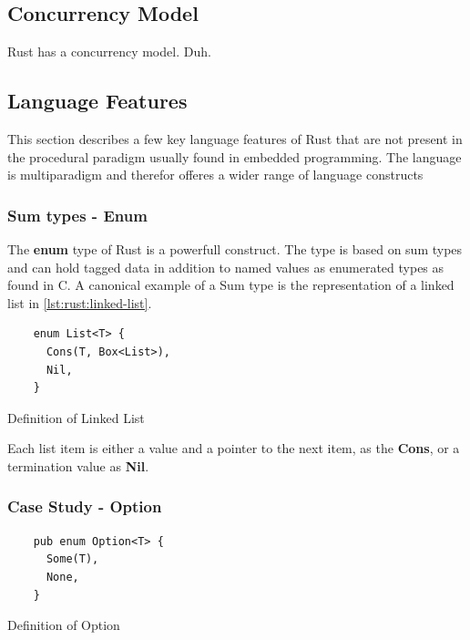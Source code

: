 

\subsection{Concurrency Model} %
\label{ssub:concurrency_model}

Rust has a concurrency model. Duh.


\subsection{Language Features}

This section describes a few key language features of Rust that are not present in the procedural paradigm usually found in embedded programming.
The language is multiparadigm and therefor offeres a wider range of language constructs

\subsubsection{Sum types - Enum}

The \textbf{enum} type of Rust is a powerfull construct.
The type is based on sum types and can hold tagged data in addition to named values as enumerated types as found in C.
A canonical example of a Sum type is the representation of a linked list in \ref{lst:rust:linked-list}.

\begin{listing}[H]
  \begin{verbatim}
    enum List<T> {
      Cons(T, Box<List>),
      Nil,
    }
  \end{verbatim}
  \caption{Definition of Linked List}
  \label{lst:rust:list}
\end{listing}

Each list item is either a value and a pointer to the next item, as the \textbf{Cons}, or a termination value as \textbf{Nil}.

\subsubsection{Case Study - Option}

\begin{listing}[H]
  \begin{verbatim}
    pub enum Option<T> {
      Some(T),
      None,
    }
  \end{verbatim}
  \caption{Definition of Option}
  \label{lst:rust:option}
\end{listing}

